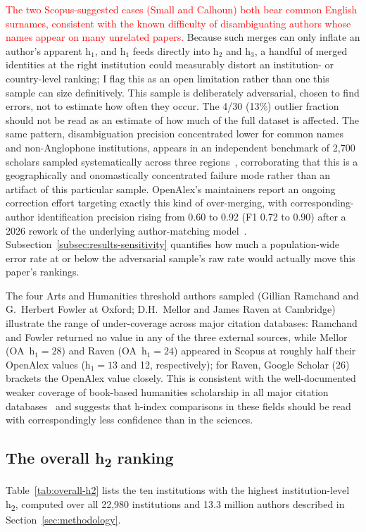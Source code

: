 \textcolor{red}{The two Scopus-suggested cases (Small and Calhoun) both bear common English surnames, consistent with the known difficulty of disambiguating authors whose names appear on many unrelated papers.} Because such merges can only inflate an author's apparent $\mathrm{h}_1$, and $\mathrm{h}_1$ feeds directly into $\mathrm{h}_2$ and $\mathrm{h}_3$, a handful of merged identities at the right institution could measurably distort an institution- or country-level ranking; I flag this as an open limitation rather than one this sample can size definitively. This sample is deliberately adversarial, chosen to find errors, not to estimate how often they occur. The 4/30 (13\%) outlier fraction should not be read as an estimate of how much of the full dataset is affected. The same pattern, disambiguation precision concentrated lower for common names and non-Anglophone institutions, appears in an independent benchmark of 2{,}700 scholars sampled systematically across three regions~\citep{zhao2025}, corroborating that this is a geographically and onomastically concentrated failure mode rather than an artifact of this particular sample. OpenAlex's maintainers report an ongoing correction effort targeting exactly this kind of over-merging, with corresponding-author identification precision rising from 0.60 to 0.92 (F1 0.72 to 0.90) after a 2026 rework of the underlying author-matching model~\citep{demes2026}. Subsection~\ref{subsec:results-sensitivity} quantifies how much a population-wide error rate at or below the adversarial sample's raw rate would actually move this paper's rankings.

The four Arts and Humanities threshold authors sampled (Gillian Ramchand and G.\ Herbert Fowler at Oxford; D.H.\ Mellor and James Raven at Cambridge) illustrate the range of under-coverage across major citation databases: Ramchand and Fowler returned no value in any of the three external sources, while Mellor (OA~$\mathrm{h}_1=28$) and Raven (OA~$\mathrm{h}_1=24$) appeared in Scopus at roughly half their OpenAlex values ($\mathrm{h}_1=13$ and 12, respectively); for Raven, Google Scholar (26) brackets the OpenAlex value closely. This is consistent with the well-documented weaker coverage of book-based humanities scholarship in all major citation databases~\citep{nederhof2006} and suggests that h-index comparisons in these fields should be read with correspondingly less confidence than in the sciences.

\subsection{The overall h\textsubscript{2} ranking}
\label{subsec:overall-h2}
Table~\ref{tab:overall-h2} lists the ten institutions with the highest institution-level h\textsubscript{2}, computed over all 22,980 institutions and 13.3 million authors described in Section~\ref{sec:methodology}.

